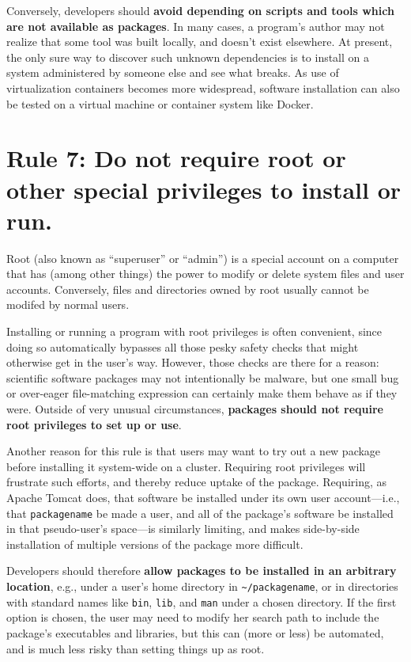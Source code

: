 \documentclass[10pt,letterpaper]{article}
\newcommand{\rulemajor}[1]{\section{#1}}
\newcommand{\ruleminor}[1]{\textbf{#1}}
\begin{document}
Conversely, developers should \ruleminor{avoid depending on scripts
and tools which are not available as packages}.  In many cases, a
program's author may not realize that some tool was built locally, and
doesn't exist elsewhere. At present, the only sure way to discover
such unknown dependencies is to install on a system administered by
someone else and see what breaks. As use of virtualization containers
becomes more widespread, software installation can also be tested on a
virtual machine or container system like Docker.

\rulemajor{Rule 7: Do not require root or other special privileges to install or run.}

Root (also known as ``superuser'' or ``admin'') is a special account
on a computer that has (among other things) the power to modify or
delete system files and user accounts. Conversely, files and
directories owned by root usually cannot be modifed by normal users.

Installing or running a program with root privileges is often
convenient, since doing so automatically bypasses all those pesky
safety checks that might otherwise get in the user's way. However,
those checks are there for a reason: scientific software packages may
not intentionally be malware, but one small bug or over-eager
file-matching expression can certainly make them behave as if they
were. Outside of very unusual circumstances, \ruleminor{packages
should not require root privileges to set up or use}.

Another reason for this rule is that users may want to try out a new
package before installing it system-wide on a cluster. Requiring root
privileges will frustrate such efforts, and thereby reduce uptake of
the package. Requiring, as Apache Tomcat does, that software be
installed under its own user account---i.e., that \texttt{packagename}
be made a user, and all of the package's software be installed in that
pseudo-user's space---is similarly limiting, and makes side-by-side
installation of multiple versions of the package more difficult.

Developers should therefore \ruleminor{allow packages to be installed
in an arbitrary location}, e.g., under a user's home directory in
\texttt{\textasciitilde{}/packagename}, or in directories with
standard names like \texttt{bin}, \texttt{lib}, and \texttt{man} under
a chosen directory. If the first option is chosen, the user may need
to modify her search path to include the package's executables and
libraries, but this can (more or less) be automated, and is much less
risky than setting things up as root.
\end{document}
